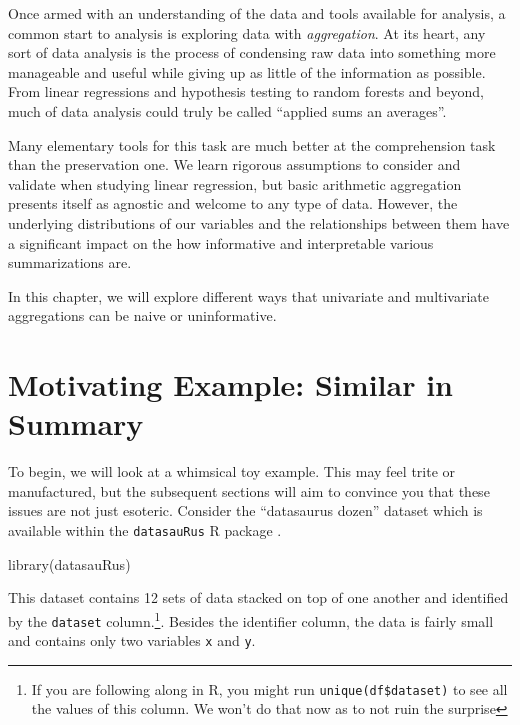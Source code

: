 \documentclass[
]{krantz}
\makeatletter
\newenvironment{Shaded}{\begin{snugshade}}{\end{snugshade}}
\newcommand{\FunctionTok}[1]{\textcolor[rgb]{0,0,0}{#1}}
\newcommand{\NormalTok}[1]{#1}
\newenvironment{kframe}{%
\medskip{}
\setlength{\fboxsep}{.8em}
 \def\at@end@of@kframe{}%
 \ifinner\ifhmode%
  \def\at@end@of@kframe{\end{minipage}}%
  \begin{minipage}{\columnwidth}%
 \fi\fi%
 \def\FrameCommand##1{\hskip\@totalleftmargin \hskip-\fboxsep
 \colorbox{shadecolor}{##1}\hskip-\fboxsep
     \hskip-\linewidth \hskip-\@totalleftmargin \hskip\columnwidth}%
 \MakeFramed {\advance\hsize-\width
   \@totalleftmargin\z@ \linewidth\hsize
   \@setminipage}}%
 {\par\unskip\endMakeFramed%
 \at@end@of@kframe}
\renewenvironment{Shaded}{\begin{kframe}}{\end{kframe}}
\makeatother
\begin{document}
Once armed with an understanding of the data and tools available for analysis, a common start to analysis is exploring data with \emph{aggregation}.
At its heart, any sort of data analysis is the process of condensing raw data into something more manageable and useful while giving up as little of the information as possible.
From linear regressions and hypothesis testing to random forests and beyond, much of data analysis could truly be called ``applied sums an averages''.

Many elementary tools for this task are much better at the comprehension task than the preservation one.
We learn rigorous assumptions to consider and validate when studying linear regression, but basic arithmetic aggregation presents itself as agnostic and welcome to any type of data.
However, the underlying distributions of our variables and the relationships between them have a significant impact on the how informative and interpretable various summarizations are.

In this chapter, we will explore different ways that univariate and multivariate aggregations can be naive or uninformative.

\hypertarget{motivating-example-similar-in-summary}{%
\section{Motivating Example: Similar in Summary}\label{motivating-example-similar-in-summary}}

To begin, we will look at a whimsical toy example.
This may feel trite or manufactured, but the subsequent sections will aim to convince you that these issues are not just esoteric.
Consider the ``datasaurus dozen'' dataset \citep{datasaurus} which is available within the \texttt{datasauRus} R package \citep{R-datasauRus}.

\begin{Shaded}
\begin{Highlighting}[]
\FunctionTok{library}\NormalTok{(datasauRus)}
\end{Highlighting}
\end{Shaded}

This dataset contains 12 sets of data stacked on top of one another and identified by the \texttt{dataset} column.\footnote{If you are following along in R, you might run \texttt{unique(df\$dataset)} to see all the values of this column. We won't do that now as to not ruin the surprise}.
Besides the identifier column, the data is fairly small and contains only two variables \texttt{x} and \texttt{y}.
\end{document}
